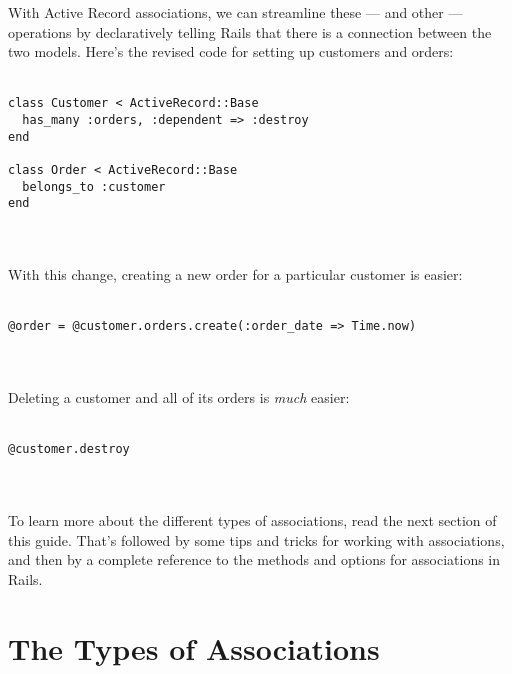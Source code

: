 \documentclass[10pt]{book}
\begin{document}
With Active Record associations, we can streamline these — and other —  operations by declaratively telling Rails that there is a connection  between the two models. Here’s the revised code for setting up customers  and orders:
\\ \\
\begin{minipage}{\textwidth}{\scriptsize
\begin{verbatim}
class Customer < ActiveRecord::Base
  has_many :orders, :dependent => :destroy
end
 
class Order < ActiveRecord::Base
  belongs_to :customer
end
\end{verbatim}}
\end{minipage}
\\ \\

With this change, creating a new order for a particular customer is easier:
\\ \\
\begin{minipage}{\textwidth}{\scriptsize
\begin{verbatim}
@order = @customer.orders.create(:order_date => Time.now)
\end{verbatim}}
\end{minipage}
\\ \\

Deleting a customer and all of its orders is \emph{much} easier:
\\ \\
\begin{minipage}{\textwidth}{\scriptsize
\begin{verbatim}
@customer.destroy
\end{verbatim}}
\end{minipage}
\\ \\

To learn more about the different types of associations, read the  next section of this guide. That’s followed by some tips and tricks for  working with associations, and then by a complete reference to the  methods and options for associations in Rails.

\section{ The Types of Associations}
\end{document}
